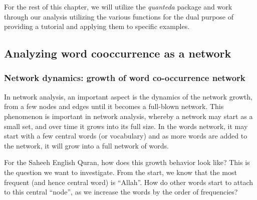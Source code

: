\documentclass[
]{article}
\begin{document}
\normalsize

For the rest of this chapter, we will utilize the \emph{quanteda} package and work through our analysis utilizing the various functions for the dual purpose of providing a tutorial and applying them to specific examples.

\hypertarget{analyzing-word-cooccurrences-as-a-network}{%
\subsection{Analyzing word cooccurrence as a network}\label{analyzing-word-cooccurrences-as-a-network}}

\hypertarget{network-dynamics-growth-of-word-co-occurrence-network}{%
\subsubsection{Network dynamics: growth of word co-occurrence network}\label{network-dynamics-growth-of-word-co-occurrence-network}}

In network analysis, an important aspect is the dynamics of the network growth, from a few nodes and edges until it becomes a full-blown network. This phenomenon is important in network analysis, whereby a network may start as a small set, and over time it grows into its full size. In the words network, it may start with a few central words (or vocabulary) and as more words are added to the network, it will grow into a full network of words.

For the Saheeh English Quran, how does this growth behavior look like? This is the question we want to investigate. From the start, we know that the most frequent (and hence central word) is ``Allah''. How do other words start to attach to this central ``node'', as we increase the words by the order of frequencies?
\end{document}
